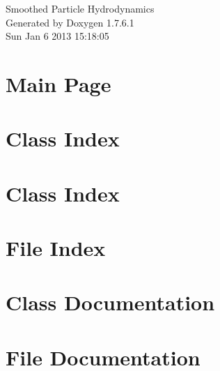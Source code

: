 \documentclass[a4paper]{book}
\begin{document}
\hypersetup{pageanchor=false,citecolor=blue}
\begin{titlepage}
\vspace*{7cm}
\begin{center}
{\Large \-Smoothed \-Particle \-Hydrodynamics }\\
\vspace*{1cm}
{\large \-Generated by Doxygen 1.7.6.1}\\
\vspace*{0.5cm}
{\small Sun Jan 6 2013 15:18:05}\\
\end{center}
\end{titlepage}
\clearemptydoublepage
{}
\tableofcontents
\clearemptydoublepage
{}
\hypersetup{pageanchor=true,citecolor=blue}
\chapter{\-Main \-Page}
\label{index}\hypertarget{index}{}
\chapter{\-Class \-Index}

\chapter{\-Class \-Index}

\chapter{\-File \-Index}

\chapter{\-Class \-Documentation}












\chapter{\-File \-Documentation}














\printindex
\end{document}
